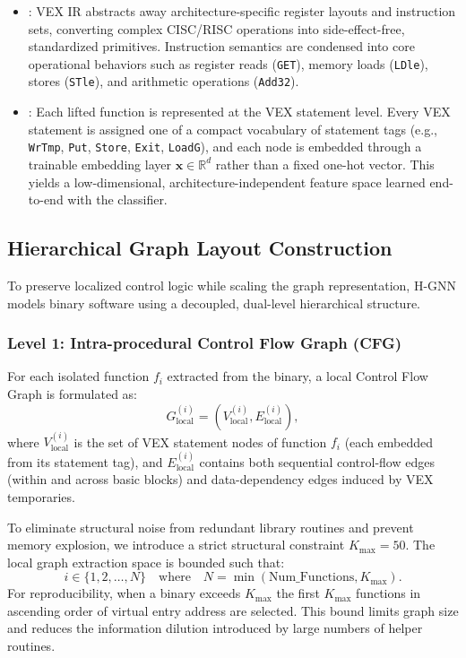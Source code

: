 \documentclass{llncs}
\begin{document}
\begin{itemize}
    \item {}: VEX IR abstracts away architecture-specific register layouts and instruction sets, converting complex CISC/RISC operations into side-effect-free, standardized primitives. Instruction semantics are condensed into core operational behaviors such as register reads (\texttt{GET}), memory loads (\texttt{LDle}), stores (\texttt{STle}), and arithmetic operations (\texttt{Add32}).
    \item {}: Each lifted function is represented at the VEX
statement level. Every VEX statement is assigned one of a compact vocabulary of
statement tags (e.g., \texttt{WrTmp}, \texttt{Put}, \texttt{Store}, \texttt{Exit}, \texttt{LoadG}),
and each node is embedded through a trainable embedding layer $\mathbf{x} \in \mathbb{R}^{d}$
rather than a fixed one-hot vector. This yields a low-dimensional, architecture-independent
feature space learned end-to-end with the classifier.
\end{itemize}

\subsection{Hierarchical Graph Layout Construction}
To preserve localized control logic while scaling the graph representation, H-GNN models binary software using a decoupled, dual-level hierarchical structure.

\subsubsection{Level 1: Intra-procedural Control Flow Graph (CFG)}
For each isolated function $f_i$ extracted from the binary, a local Control Flow Graph is formulated as:
\begin{equation}
G_{\text{local}}^{(i)} = (V_{\text{local}}^{(i)}, E_{\text{local}}^{(i)}),
\end{equation}
where $V_{\text{local}}^{(i)}$ is the set of VEX statement nodes of function $f_i$
(each embedded from its statement tag), and $E_{\text{local}}^{(i)}$ contains both sequential
control-flow edges (within and across basic blocks) and data-dependency edges induced by VEX
temporaries.

To eliminate structural noise from redundant library routines and prevent memory explosion, we introduce a strict structural constraint $K_{\text{max}} = 50$. The local graph extraction space is bounded such that:
\begin{equation}
i \in \{1, 2, \dots, N\} \quad \text{where} \quad N = \min(\text{Num\_Functions}, K_{\text{max}}).
\end{equation}
For reproducibility, when a binary exceeds $K_{\text{max}}$ the first $K_{\text{max}}$ functions in ascending order of virtual entry address are selected. This bound limits graph size and reduces the information dilution introduced by large numbers of helper routines.
\end{document}
